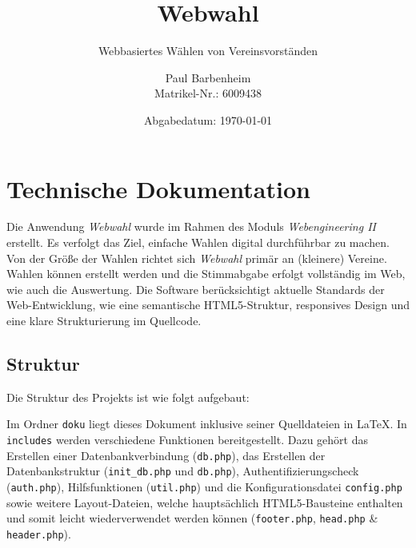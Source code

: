 \documentclass[a4paper]{scrartcl}
\newcommand{\file}[1]{\texttt{#1}}
\begin{document}
	\titlehead{Modul: Web Engineering II}
	\subject{Projektdokumentation}
	\author{Paul Barbenheim \\ Matrikel-Nr.: 6009438}
	\title{Webwahl}
	\subtitle{Webbasiertes Wählen von Vereinsvorständen}
	\date{Abgabedatum: \today}
	
	
	\maketitle
	
	\section{Technische Dokumentation}
	Die Anwendung \textit{Webwahl} wurde im Rahmen des Moduls \textit{Webengineering II} erstellt. Es verfolgt das Ziel, einfache Wahlen digital durchführbar zu machen. Von der Größe der Wahlen richtet sich \textit{Webwahl} primär an (kleinere) Vereine. Wahlen können erstellt werden und die Stimmabgabe erfolgt vollständig im Web, wie auch die Auswertung. Die Software berücksichtigt aktuelle Standards der Web-Entwicklung, wie eine semantische HTML5-Struktur, responsives Design und eine klare Strukturierung im Quellcode.
	
	\subsection{Struktur}
	Die Struktur des Projekts ist wie folgt aufgebaut:
	
	\vspace{\baselineskip}
	
	\noindent Im Ordner \file{doku} liegt dieses Dokument inklusive seiner Quelldateien in \LaTeX. In \file{includes} werden verschiedene Funktionen bereitgestellt. Dazu gehört das Erstellen einer Datenbankverbindung (\file{db.php}), das Erstellen der Datenbankstruktur (\file{init\_db.php} und \file{db.php}), Authentifizierungscheck (\file{auth.php}), Hilfsfunktionen (\file{util.php}) und die Konfigurationsdatei \file{config.php} sowie weitere Layout-Dateien, welche hauptsächlich HTML5-Bausteine enthalten und somit leicht wiederverwendet werden können (\file{footer.php}, \file{head.php} \& \file{header.php}).\\
	
\end{document}

